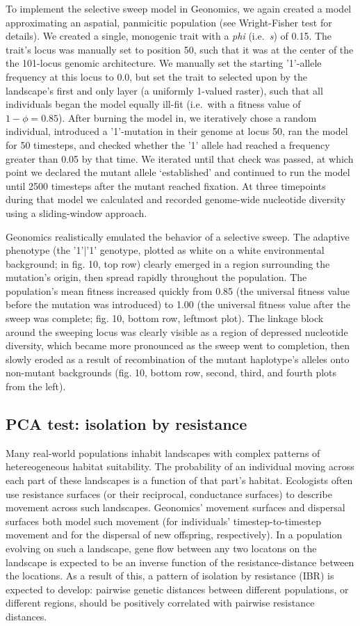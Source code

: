 ﻿\documentclass{article}
\begin{document}
To implement the selective sweep model in Geonomics, we again created a model
approximating an aspatial, panmicitic population (see Wright-Fisher test for details).
We created a single, monogenic trait with a \emph{phi} (i.e.\ \emph{s}) of 0.15.
The trait's locus was manually set to position 50,
such that it was at the center of the the 101-locus genomic architecture.
We manually set the starting '1'-allele frequency at this locus to 0.0,
but set the trait to selected upon by the landscape's first and only layer
(a uniformly 1-valued raster), such that all individuals began the model
equally ill-fit (i.e.\ with a fitness value of $1 - \phi = 0.85$).
After burning the model in, we iteratively chose a random individual,
introduced a '1'-mutation in their genome at locus 50, ran the model for 50 timesteps,
and checked whether the '1' allele had reached a frequency greater than 0.05 by that time.
We iterated until that check was passed, at which point we declared the mutant allele
`established' and continued to run the model until 2500 timesteps
after the mutant reached fixation.
At three timepoints during that model we calculated and recorded
genome-wide nucleotide diversity using a sliding-window approach.

Geonomics realistically emulated the behavior of a selective sweep.
The adaptive phenotype (the '1'|'1' genotype, plotted as white
on a white environmental background; in fig. 10, top row)
clearly emerged in a region surrounding the mutation's origin,
then spread rapidly throughout the population.
The population's mean fitness increased quickly from 0.85
(the universal fitness value before the mutation was introduced) to 1.00
(the universal fitness value after the sweep was complete; fig. 10, bottom row, leftmost plot).
The linkage block around the sweeping locus was clearly visible
as a region of depressed nucleotide diversity, which became more pronounced
as the sweep went to completion, then slowly eroded as a result of recombination
of the mutant haplotype's alleles onto non-mutant backgrounds
(fig. 10, bottom row, second, third, and fourth plots from the left).


\subsection{PCA test: isolation by resistance}
Many real-world populations inhabit landscapes with complex patterns
of hetereogeneous habitat suitability.
The probability of an individual moving across each part of these landscapes
is a function of that part's habitat.
Ecologists often use resistance surfaces (or their reciprocal, conductance surfaces)
to describe movement across such landscapes.
Geonomics' movement surfaces and dispersal surfaces both model such movement
(for individuals' timestep-to-timestep movement and for the dispersal of new
offspring, respectively).
In a population evolving on such a landscape, gene flow between any two locatons on the
landscape is expected to be an inverse function of the resistance-distance between the locations.
As a result of this, a pattern of isolation by resistance (IBR) is expected to develop:
pairwise genetic distances between different populations, or different regions, should be
positively correlated with pairwise resistance distances.
\end{document}
